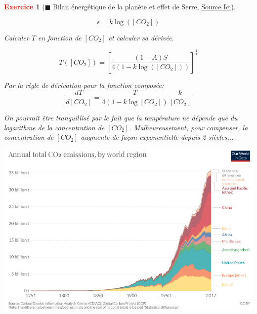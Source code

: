 \documentclass[11pt]{article}
\theoremstyle{mythmstyle}
\newtheorem{exo}{\textcolor{red}{\textbf{Exercice}}}
\begin{document}
\begin{exo}[$\blacksquare$ Bilan énergétique de la planète et effet de Serre, \href{http://step.ipgp.fr/images/e/ec/Bernard_geodynext_td1_corr.pdf}{Source Ici}]
\begin{enumerate}
$$
\epsilon= k\log([CO_2])
$$

Calculer $T$ en fonction de $[CO_2]$ et calculer sa dérivée.

\begin{solution}
$$
T([CO_2])= [\frac{(1-A)S}{4(1-k\log([CO_2]))}]^{\frac{1}{4}}
$$

Par la règle de dérivation pour la fonction composée:
$$
\frac{dT}{d[CO_2]}= \frac{T}{4(1-k\log[CO_2])}\frac{k}{[CO_2]}
$$
\end{solution}


\end{enumerate}

On pourrait être tranquillisé par le fait que la température ne dépende que du logarithme de la concentration de $[CO_2]$. Malheureusement, pour compenser, la concentration de $[CO_2]$ augmente de façon exponentielle depuis 2 siècles...

\begin{center}
    \includegraphics[scale=0.4]{co2increase.png}
\end{center}

\end{exo}

\vspace{3cm}
\end{document}
